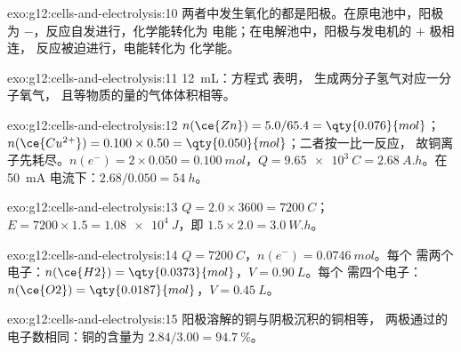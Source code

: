 \begin{solution}{exo:g12:cells-and-electrolysis:10}
两者中发生氧化的都是阳极。在原电池中，阳极
为 $-$，反应自发进行，化学能转化为
电能；在电解池中，阳极与发电机的 $+$ 极相连，
反应被迫进行，电能转化为
化学能。
\end{solution}

\begin{solution}{exo:g12:cells-and-electrolysis:11}
\qty{12}{mL}：方程式  表明，
生成两分子氢气对应一分子氧气，
且等物质的量的气体体积相等。
\end{solution}

\begin{solution}{exo:g12:cells-and-electrolysis:12}
$n(\ce{Zn}) = 5.0/65.4 = \qty{0.076}{mol}$；
$n(\ce{Cu^{2+}}) = 0.100 \times 0.50 = \qty{0.050}{mol}$；二者按一比一反应，
故铜离子先耗尽。$n(e^-) = 2 \times 0.050
= \qty{0.100}{mol}$，$Q = \qty{9.65e3}{C} = \qty{2.68}{A.h}$。在
\qty{50}{mA} 电流下：$2.68/0.050 = \qty{54}{h}$。
\end{solution}

\begin{solution}{exo:g12:cells-and-electrolysis:13}
$Q = 2.0 \times 3600 = \qty{7200}{C}$；$E = 7200 \times 1.5 =
\qty{1.08e4}{J}$，即 $1.5 \times 2.0 = \qty{3.0}{W.h}$。
\end{solution}

\begin{solution}{exo:g12:cells-and-electrolysis:14}
$Q = \qty{7200}{C}$，$n(e^-) = \qty{0.0746}{mol}$。每个
 需两个电子：$n(\ce{H2}) = \qty{0.0373}{mol}$，$V = \qty{0.90}{L}$。每个
 需四个电子：$n(\ce{O2}) = \qty{0.0187}{mol}$，$V = \qty{0.45}{L}$。
\end{solution}

\begin{solution}{exo:g12:cells-and-electrolysis:15}
阳极溶解的铜与阴极沉积的铜相等，
两极通过的电子数相同：铜的含量为 $2.84/3.00 = \qty{94.7}{\percent}$。
\end{solution}

